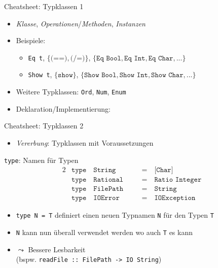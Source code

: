 \documentclass{beamer}
\begin{document}
\begin{frame}{Cheatsheet: Typklassen 1}
  \begin{itemize}
    \item \emph{Klasse}, \emph{Operationen}/\emph{Methoden}, \emph{Instanzen}
    \item Beispiele:
    \begin{itemize}
      \item \texttt{Eq t}, $\{ \texttt{(==)}, \texttt{(/=)} \}$, $\{ \texttt{Eq Bool}, \texttt{Eq Int}, \texttt{Eq Char}, ... \}$
      \item \texttt{Show t}, $\{ \texttt{show} \}$, $\{ \texttt{Show Bool}, \texttt{Show Int}, \texttt{Show Char}, ... \}$
    \end{itemize}
    \item Weitere Typklassen: \texttt{Ord}, \texttt{Num}, \texttt{Enum}
    \item Deklaration/Implementierung:
  \end{itemize}

\end{frame}

\begin{frame}{Cheatsheet: Typklassen 2}
  \begin{itemize}
    \item \emph{Vererbung}: Typklassen mit Voraussetzungen
  \end{itemize}

\end{frame}

\begin{frame}{\texttt{type}: Namen für Typen}
    \begin{alignat*}{2}
        & \texttt{type} \quad \texttt{String} \quad && \texttt{=} \quad \texttt{[Char]} \\
        & \texttt{type} \quad \texttt{Rational} \quad && \texttt{=} \quad \texttt{Ratio Integer} \\
        & \texttt{type} \quad \texttt{FilePath} \quad && \texttt{=} \quad \texttt{String} \\
        & \texttt{type} \quad \texttt{IOError} \quad && \texttt{=} \quad \texttt{IOException}
    \end{alignat*}

    \begin{itemize}
        \item \texttt{type N = T} definiert einen neuen Typnamen \texttt{N} für den Typen \texttt{T}
        \item \texttt{N} kann nun überall verwendet werden wo auch \texttt{T} es kann
        \item $\leadsto$ Bessere Lesbarkeit\\
              (bspw. \texttt{readFile :: FilePath -> IO String})
    \end{itemize}
\end{frame}
\end{document}
